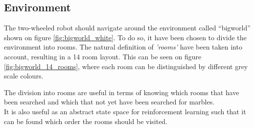 \documentclass[../Head/Main.tex]{subfiles}
\begin{document}
\subsection{Environment}
\label{subsec:design_environment}
The two-wheeled robot should navigate around the environment called “bigworld” shown on figure \ref{fig:bigworld_white}. To do so, it have been chosen to divide the environment into rooms. The natural definition of \textit{'rooms'} have been taken into account, resulting in a 14 room layout. This can be seen on figure \ref{fig:bigworld_14_rooms}, where each room can be distinguished by different grey scale colours. 

The division into rooms are useful in terms of knowing which rooms that have been searched and which that not yet have been searched for marbles.\\
It is also useful as an abstract state space for reinforcement learning such that it can be found which order the rooms  should be visited.
\end{document}
